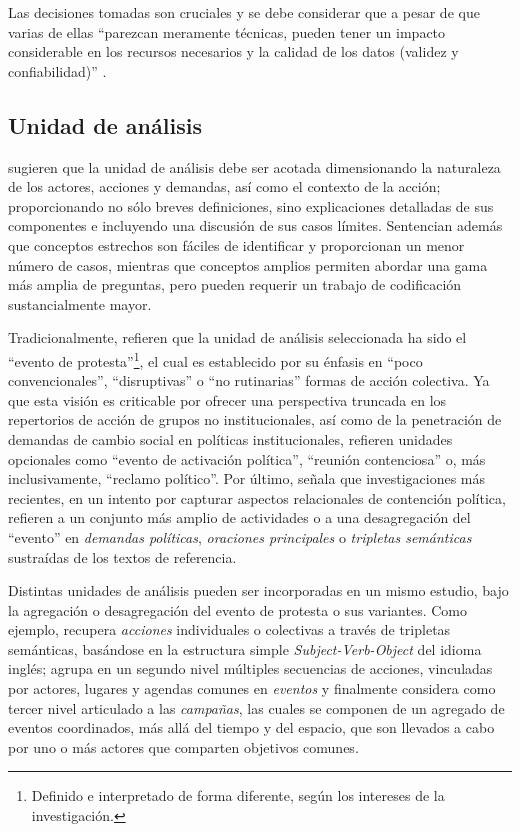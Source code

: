 \documentclass[letterpaper, 11pt]{book}
\theoremstyle{definition}
\theoremstyle{remark}
\begin{document}
Las decisiones tomadas son cruciales y se debe considerar que a pesar de que varias de ellas ``parezcan meramente técnicas, pueden tener un impacto considerable en los recursos necesarios y la calidad de los datos (validez y confiabilidad)'' \citep[234--235]{2002_Koopmans_AEP}.




\subsection{Unidad de análisis}
\label{sec:AEP_unidad_analisis}

\citet{2002_Koopmans_AEP} sugieren que la unidad de análisis debe ser acotada dimensionando la naturaleza de los actores, acciones y demandas, así como el contexto de la acción; proporcionando no sólo breves definiciones, sino explicaciones detalladas de sus componentes e incluyendo una discusión de sus casos límites. 
Sentencian además que conceptos estrechos son fáciles de identificar y proporcionan un menor número de casos, mientras que conceptos amplios permiten abordar una gama más amplia de preguntas, pero pueden requerir un trabajo de codificación sustancialmente mayor. 

Tradicionalmente, \citet{1999_Koopmans_AEPWhere} refieren que la unidad de análisis seleccionada ha sido el ``evento de protesta''\footnote{Definido e interpretado de forma diferente, según los intereses de la investigación.}, el cual es establecido por su énfasis en ``poco convencionales'', ``disruptivas'' o ``no rutinarias'' formas de acción colectiva. 
Ya que esta visión es criticable por ofrecer una perspectiva truncada en los repertorios de acción de grupos no institucionales, así como de la penetración de demandas de cambio social en políticas institucionales, \citet{2002_Koopmans_AEP} refieren unidades opcionales como ``evento de activación política'', ``reunión contenciosa'' o, más inclusivamente, ``reclamo político''. 
Por último, \citet{2014_Hutter_AEP}  señala que investigaciones más recientes, en un intento por capturar aspectos relacionales de contención política, refieren a un conjunto más amplio de actividades o a una desagregación del ``evento'' en \emph{demandas políticas}, \emph{oraciones principales} o \emph{tripletas semánticas} sustraídas de los textos de referencia.


Distintas unidades de análisis pueden ser incorporadas en un mismo estudio, bajo la agregación o desagregación del evento de protesta o sus variantes. 
Como ejemplo, \citet{2003_Wada_Tesis} recupera \emph{acciones} individuales o colectivas a través de tripletas semánticas, basándose en la estructura simple \emph{Subject-Verb-Object} del idioma inglés; agrupa en un segundo nivel múltiples secuencias de acciones, vinculadas por actores, lugares y agendas comunes en \emph{eventos} y finalmente considera como tercer nivel articulado a las \emph{campañas}, las cuales se componen de un agregado de eventos coordinados, más allá del tiempo y del espacio, que son llevados a cabo por uno o más actores que comparten objetivos comunes. 
\end{document}
